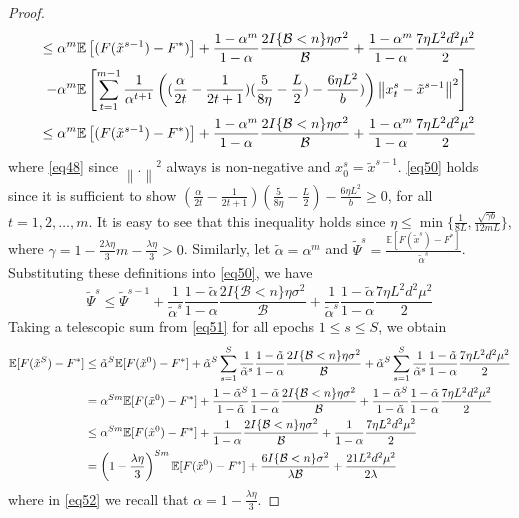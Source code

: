 \documentclass{article}
\newcommand*{\E}{\mathbb{E}}
\newcommand{\norm}[1]{\left\lVert#1\right\rVert}
\theoremstyle{definition}
\theoremstyle{remark}
\begin{document}
\begin{proof}
\begin{align}
\leq\alpha^m\E&\left[(F(\tilde{x}^{s-1}) - F^*)\right] + \frac{1-\alpha^m}{1-\alpha}\frac{2I\{\mathcal{B} < n\}\eta \sigma ^2}{\mathcal{B}}+\frac{1-\alpha^m}{1-\alpha}\frac{7 \eta L^2 d^2 \mu^2}{2}\notag
\\-\alpha^m\E&\left[\sum_{t=1}^{m-1}\frac{1}{\alpha^{t+1}}\left((\frac{\alpha}{2t} - \frac{1}{2t+1})(\frac{5}{8\eta} - \frac{L}{2})-\frac{6 \eta L^2}{b})\right) \norm{x_{t}^s-\tilde{x}^{s-1}}^2 \right]\notag\\
\leq\alpha^m\E&\left[(F(\tilde{x}^{s-1}) - F^*)\right] + \frac{1-\alpha^m}{1-\alpha}\frac{2I\{\mathcal{B} < n\}\eta \sigma ^2}{\mathcal{B}}+\frac{1-\alpha^m}{1-\alpha}\frac{7 \eta L^2 d^2 \mu^2}{2}\label{eq50}
\end{align}
where \eqref{eq48} since $\norm{.}^2$ always is non-negative and $x_0^s=\tilde{x}^{s-1}$. \eqref{eq50} holds since it is sufficient to show $(\frac{\alpha}{2t} - \frac{1}{2t+1})(\frac{5}{8\eta} - \frac{L}{2})- \frac{6\eta L^2}{b} \geq 0$, for all $t=1, 2,\ldots, m$. 
It is easy to see that this inequality holds since $\eta \leq \min\{\frac{1}{8L}, \frac{\sqrt{\gamma b}}{12 m L }\}$, where $\gamma = 1-\frac{2\lambda\eta}{3} m-\frac{\lambda\eta}{3} > 0$. Similarly, let  $\tilde{\alpha} = \alpha^m$ and $\tilde{\Psi}^s = \frac{\E[F(\tilde{x}^{s})-F^*]}{\tilde{\alpha}^s}$. Substituting these definitions into \eqref{eq50}, we have
\begin{equation}\label{eq51}
\tilde{\Psi}^s \leq \tilde{\Psi}^{s-1} + \frac{1}{\tilde{\alpha}^s} \frac{1-\tilde{\alpha}}{1-{\alpha}}\frac{2 I\{\mathcal{B} < n\}\eta \sigma ^2}{\mathcal{B}}+ \frac{1}{\tilde{\alpha}^s} \frac{1-\tilde{\alpha}}{1-{\alpha}}\frac{7\eta L^2 d^2 \mu^2}{2}
\end{equation}
Taking a telescopic sum from \eqref{eq51} for all epochs $1 \leq s \leq S$, we obtain
\begin{align}
\E[F(\tilde{x}^S) - {F}^*] & \leq \tilde{\alpha}^{S} \E[F(\tilde{x}^0) - {F}^*] + \tilde{\alpha}^{S} \sum_{s=1}^S \frac{1}{\tilde{\alpha}^s}\frac{1-\tilde{\alpha}}{1-{\alpha}}\frac{2I\{\mathcal{B} < n\}\eta \sigma ^2}{\mathcal{B}} + \tilde{\alpha}^{S} \sum_{s=1}^S \frac{1}{\tilde{\alpha}^s}\frac{1-\tilde{\alpha}}{1-{\alpha}}\frac{7 \eta L^2 d^2 \mu^2}{2}\notag\\
& = {\alpha}^{Sm} \E[F(\tilde{x}^0) - {F}^*] + \frac{1-\tilde{\alpha}^S}{1-\tilde{\alpha}}\frac{1-\tilde{\alpha}}{1-{\alpha}}\frac{2I\{\mathcal{B} < n\}\eta \sigma ^2}{\mathcal{B}}+ \frac{1-\tilde{\alpha}^S}{1-\tilde{\alpha}}\frac{1-\tilde{\alpha}}{1-{\alpha}}\frac{7 \eta L^2 d^2 \mu^2}{2}\notag\\
& \leq {\alpha}^{Sm} \E[F(\tilde{x}^0) - {F}^*] + \frac{1}{1-{\alpha}}\frac{2 I\{\mathcal{B} < n\}\eta \sigma ^2}{\mathcal{B}}+ \frac{1}{1-{\alpha}}\frac{7 \eta L^2 d^2 \mu^2}{2}\notag\\
& = \left(1-\frac{\lambda\eta}{3}\right)^{Sm} \E[F(\tilde{x}^0) - {F}^*] + \frac{6I\{\mathcal{B} < n\} \sigma ^2}{\lambda\mathcal{B}}+\frac{21 L^2 d^2 \mu^2}{2\lambda}\label{eq52}
\end{align}
where in \eqref{eq52} we recall that $\alpha = 1-\frac{\lambda\eta}{3}$.
\end{proof}
\end{document}
